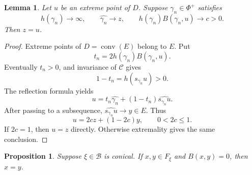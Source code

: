 \documentclass[11pt,reqno]{amsart}
\theoremstyle{plain}
\newtheorem{lemma}[theorem]{Lemma}
\newtheorem{proposition}[theorem]{Proposition}
\theoremstyle{definition}
\theoremstyle{remark}
\numberwithin{equation}{section}
\begin{document}
\begin{lemma}\label{lem:32-extreme}
Let $u$ be an extreme point of $D$.
Suppose $\gamma_n\in\Phi^+$ satisfies
\[
    h(\gamma_n)\to\infty,\qquad
    \widehat{\gamma_n}\to z,\qquad
    h(\gamma_n)B(\gamma_n,u)\to c>0.
\]
Then $z=u$.
\end{lemma}

\begin{proof}
Extreme points of $D=\operatorname{conv}(E)$ belong to $E$.
Put
\[
    t_n=2h(\gamma_n)B(\gamma_n,u).
\]
Eventually $t_n>0$, and invariance of $\mathcal C$ gives
\[
    1-t_n=h(s_{\gamma_n}u)>0.
\]
The reflection formula yields
\[
    u=t_n\widehat{\gamma_n}
      +(1-t_n)\widehat{s_{\gamma_n}u}.
\]
After passing to a subsequence,
$\widehat{s_{\gamma_n}u}\to y\in E$.
Thus
\[
    u=2cz+(1-2c)y,\qquad 0<2c\leq1.
\]
If $2c=1$, then $u=z$ directly.
Otherwise extremality gives the same conclusion.
\end{proof}

\begin{proposition}\label{prop:32-conical}
Suppose $\xi\in\mathcal B$ is conical.
If $x,y\in F_\xi$ and $B(x,y)=0$, then $x=y$.
\end{proposition}
\end{document}
